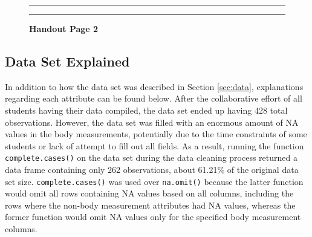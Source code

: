 \documentclass[]{article}
\begin{document}
\newpage

\begin{figure}[!ht]
    \hrule
    \caption{ \textbf{Handout Page 2} }
    \begin{center}
    \end{center}
    \label{fig:handout-2}
    \hrule
\end{figure}

\newpage

\subsection{Data Set Explained}
\label{sec:appendix-dataset-ex}

In addition to how the data set was described in Section \ref{sec:data},
explanations regarding each attribute can be found below. After the
collaborative effort of all students having their data compiled, the
data set ended up having 428 total observations. However, the data set
was filled with an enormous amount of NA values in the body
measurements, potentially due to the time constraints of some students
or lack of attempt to fill out all fields. As a result, running the
function \texttt{complete.cases()} on the data set during the data
cleaning process returned a data frame containing only 262 observations,
about 61.21\% of the original data set size. \texttt{complete.cases()}
was used over \texttt{na.omit()} because the latter function would omit
all rows containing NA values based on all columns, including the rows
where the non-body measurement attributes had NA values, whereas the
former function would omit NA values only for the specified body
measurement columns.
\end{document}
